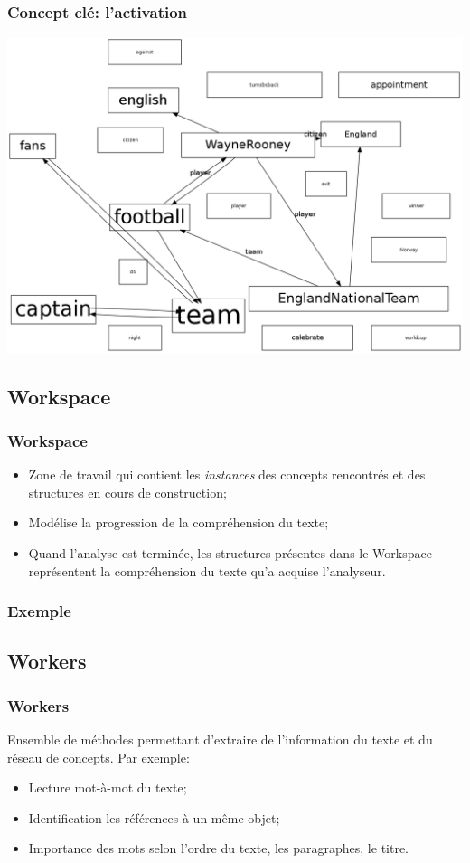 \documentclass{beamer}
\begin{document}
        \begin{frame}
        \frametitle{Concept clé: l'activation}
            \includegraphics[height=0.8\textheight]{RC/figures/RCetape30.png}
        \end{frame}

    \subsection{Workspace}
        \begin{frame}
        \frametitle{Workspace}
            \begin{itemize}
                \item Zone de travail qui contient les \textit{instances} des concepts rencontrés et des structures en cours de construction;
                \item Modélise la progression de la compréhension du texte;
                \item Quand l'analyse est terminée, les structures présentes dans le Workspace représentent la compréhension du texte qu'a acquise l'analyseur.
            \end{itemize}
        \end{frame}

        \begin{frame}
        \frametitle{Exemple}
        \end{frame}

    \subsection{Workers}
        \begin{frame}
        \frametitle{Workers}
            Ensemble de méthodes permettant d'extraire de l'information du texte et du réseau de concepts.\newline{}
            Par exemple:
            \begin{itemize}
                \item Lecture mot-à-mot du texte;
                \item Identification les références à un même objet;
                \item Importance des mots selon l'ordre du texte, les paragraphes, le titre.
            \end{itemize}
        \end{frame}
\end{document}
